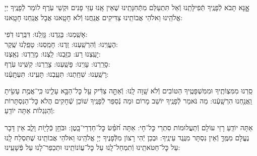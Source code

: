 \documentclass[twoside, openany, parskip=half, 11pt]{book}
\begin{document}
אׇׇָנָּא תָּבֹא לְֿפָנֶֽיךָ תְּֿפִילָּתֵֽנוּ וְֿאַל תִּתְעַלַּם מִתְּֿחִנָּתֵֽינוּ שֶׁאֵין אָֽנוּ עַזֵּי פָנִים וּקְשֵׁי עֹֽרֶף לוֹמַר לְֿפָנֶֽיךָ יְיָ אֱלֹהֵֽינוּ וֵאלֹהֵי אֲבוֹתֵֽינוּ צַדִּיקִים אֲנַֽחֲנוּ וְֿלֹא חָטָֽאנוּ אֲבָל אֲנַֽחְנוּ חָטָֽאנוּ:

אָשַֽׁמְנוּ: בָּגַֽדְנוּ: גָּזַֽלְנוּ: דִּבַּֽרְנוּ דֹֽפִי: \\
הֶעֱוִֽינוּ: וְֿהִרְשַֽׁעְנוּ: זַֽדְנוּ: חָמַֽסְנוּ: טָפַֽלְנוּ שֶֽׁקֶר:\\
יָעַֽצְנוּ רַע: כִּזַּֽבְנוּ: לַֽצְנוּ: מָרַֽדְנוּ: נִאַֽצְנוּ: \\
סָרַֽרְנוּ: עָוִֽינוּ: פָּשַֽׁעְנוּ: צָרַֽרְנוּ: קִשִּֽׁינוּ עֹֽרֶף:\\
רָשַֽׁעְנוּ: שִׁחַֽתְנוּ: תִּעַֽבְנוּ: תָּעִֽינוּ: תִּעְתָּֽעְֿנוּ:

סַֽרְנוּ מִמִּצְוֹתֶֽיךָ וּמִמִּשְׁפָּטֶֽיךָ הַטּוֹבִים וְֿלֹא שָֽׁוָה לָֽנוּ: וְֿאַתָּ֣ה צַדִּ֔יק עַ֖ל כׇּל־הַבָּ֣א עָלֵ֑ינוּ כִּֽי־אֱמֶ֥ת עָשִׂ֖יתָ וַֽאֲנַ֥חְנוּ הִרְשָֽׁעְֿנוּ: מַה נֹּאמַר לְֿפָנֶֽיךָ יוֹשֵׁב מָרוֹם וּמַה נְֿסַפֵּר לְֿפָנֶֽיךָ שׁוֹכֵן שְֿׁחָקִים הֲלֹא כׇּל־הַנִּסְתָּרוֹת וְֿהַנִּגְלוֹת אַתָּה יוֹדֵֽעַ:

אַתָּה יוֹדֵֽעַ רָזֵי עוֹלָם וְֿתַעֲלוּמוֹת סִתְרֵי כׇּל־חָי: אַתָּה חֹ֝פֵ֗שׂ כׇּל־חַדְרֵי־בָֽטֶן: וּבֹּחֵ֥ן כְּֿלָי֖וֹת וָלֵ֑ב אֵין דָּבָר נֶעֱלָּם מִמֶּֽךָּ וְֿאֵין נִסְתָּר מִנֶּֽגֶד עֵינֶֽיךָ: וּבְכֵן יְֿהִי רָצוֹן מִלְּֿפָנֶיךָ יְיָ אֱלֹהֵֽינוּ וֵאלֹהֵי אֲבוֹתֵֽינוּ שֶׁתִּסְלַח לָֽנוּ עַל כׇּל־חַטֹּאתֵֽינוּ וְֿתִמְחַל־לָֽנוּ עַל כׇּל־עֲוֹנוֹתֵֽינוּ וּתְכַפֵר־לָנוּ עַל פְּֿשָׁעֵֽינוּ:
\end{document}
